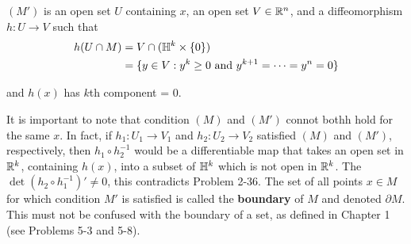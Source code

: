 \noindent $(M')$ is an open set $U$ containing $x$, an open set $V\in\mathbb{R}^n$, and a diffeomorphism 
$h\colon{}U\to V$ such that 
\begin{align*}
    h(U\cap M) 
    & = V\cap(\mathbb{H}^k\times \{0\}) \\
    & = \{y\in V:y^k\ge 0\text{ and } y^{k+1}=\cdots=y^n=0\}
\end{align*}

and $h(x)$ has $k$th component = 0.

It is important to note that condition $(M)$ and $(M')$ connot bothh hold for the same $x$. In 
fact, if $h_1:U_1\to V_1$ and $h_2:U_2\to V_2$ satisfied $(M)$ and $(M')$, respectively, then 
$h_1\circ h_2^{-1}$ would be a differentiable map that takes an open set in $\mathbb{R}^k$, containing
$h(x)$, into a subset of $\mathbb{H}^k$ which is not open in $\mathbb{R}^k$. The $\det (h_2\circ h_1^{-1})'\neq 0$,
this contradicts Problem 2-36. The set of all points $x\in M$ for which condition $M'$ is satisfied
is called the \textbf{boundary} of $M$ and denoted $\partial M$. This must not be confused with the 
boundary of a set, as defined in Chapter 1 (see Problems 5-3 and 5-8).


